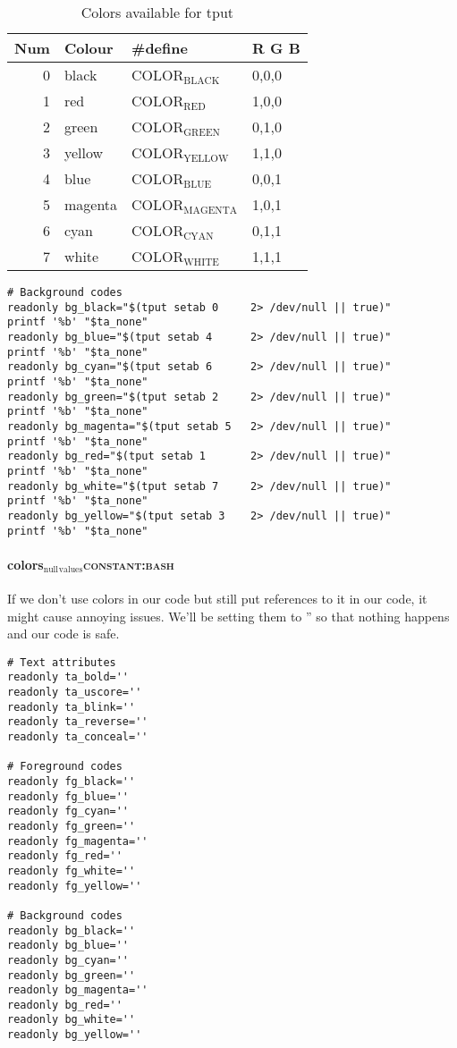 \documentclass[11pt]{article}
\begin{document}
\begin{table}[htbp]
\caption{Colors available for tput}
\centering
\begin{tabular}{rlll}
\hline
Num & Colour & \#define & R G B\\
\hline
0 & black & COLOR\(_{\text{BLACK}}\) & 0,0,0\\
1 & red & COLOR\(_{\text{RED}}\) & 1,0,0\\
2 & green & COLOR\(_{\text{GREEN}}\) & 0,1,0\\
3 & yellow & COLOR\(_{\text{YELLOW}}\) & 1,1,0\\
4 & blue & COLOR\(_{\text{BLUE}}\) & 0,0,1\\
5 & magenta & COLOR\(_{\text{MAGENTA}}\) & 1,0,1\\
6 & cyan & COLOR\(_{\text{CYAN}}\) & 0,1,1\\
7 & white & COLOR\(_{\text{WHITE}}\) & 1,1,1\\
\hline
\end{tabular}
\end{table}

\begin{verbatim}
# Background codes
readonly bg_black="$(tput setab 0     2> /dev/null || true)"
printf '%b' "$ta_none"
readonly bg_blue="$(tput setab 4      2> /dev/null || true)"
printf '%b' "$ta_none"
readonly bg_cyan="$(tput setab 6      2> /dev/null || true)"
printf '%b' "$ta_none"
readonly bg_green="$(tput setab 2     2> /dev/null || true)"
printf '%b' "$ta_none"
readonly bg_magenta="$(tput setab 5   2> /dev/null || true)"
printf '%b' "$ta_none"
readonly bg_red="$(tput setab 1       2> /dev/null || true)"
printf '%b' "$ta_none"
readonly bg_white="$(tput setab 7     2> /dev/null || true)"
printf '%b' "$ta_none"
readonly bg_yellow="$(tput setab 3    2> /dev/null || true)"
printf '%b' "$ta_none"
\end{verbatim}

\paragraph{colors\(_{\text{null}}\)\(_{\text{values}}\)\hfill{}\textsc{constant:bash}}
\label{sec:org7b43a7c}
If we don't use colors in our code but still put references to it in our code, it might cause annoying issues.
We'll be setting them to '' so that nothing happens and our code is safe.
\begin{verbatim}
# Text attributes
readonly ta_bold=''
readonly ta_uscore=''
readonly ta_blink=''
readonly ta_reverse=''
readonly ta_conceal=''

# Foreground codes
readonly fg_black=''
readonly fg_blue=''
readonly fg_cyan=''
readonly fg_green=''
readonly fg_magenta=''
readonly fg_red=''
readonly fg_white=''
readonly fg_yellow=''

# Background codes
readonly bg_black=''
readonly bg_blue=''
readonly bg_cyan=''
readonly bg_green=''
readonly bg_magenta=''
readonly bg_red=''
readonly bg_white=''
readonly bg_yellow=''
\end{verbatim}
\end{document}
